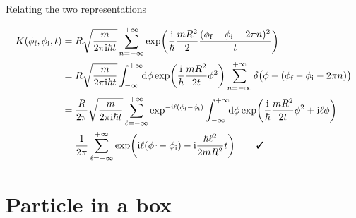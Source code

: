 \documentclass[t,dvipsnames]{beamer}
\begin{document}
\begin{frame}[c]{Relating the two representations}
 \begin{footnotesize}
  \begin{displaymath}
   \begin{aligned}
    K(\phi_\text{f}, \phi_\text{i}, t)
    &= R\sqrt{\frac{m}{2\pi\text{i}\hbar t}}
        \sum_{n=-\infty}^{+\infty}\exp\!\left(\frac{\text{i}}{\hbar}\frac{mR^2}{2}
        \frac{(\phi_\text{f}-\phi_\text{i}-2\pi n)^2}{t}\right)\\
    &= R\sqrt{\frac{m}{2\pi\text{i}\hbar t}}\int_{-\infty}^{+\infty}\!\!\text{d}\phi
       \exp\!\left(\frac{\text{i}}{\hbar}\frac{mR^2}{2t}\phi^2\right)
       \sum_{n=-\infty}^{+\infty}\delta\big(\phi-(\phi_\text{f}-\phi_\text{i}-2\pi n)\big)\\
    &= \frac{R}{2\pi}\sqrt{\frac{m}{2\pi\text{i}\hbar t}}\sum_{\ell=-\infty}^{+\infty}
 	  \exp^{-\text{i}\ell(\phi_\text{f}-\phi_\text{i})}\int_{-\infty}^{+\infty}\!\!\text{d}\phi
       \exp\!\left(\frac{\text{i}}{\hbar}\frac{mR^2}{2t}\phi^2+\text{i}\ell\phi\right)\\
    &= \frac{1}{2\pi}\sum_{\ell=-\infty}^{+\infty}\exp\!\left(\text{i}\ell(\phi_\text{f}-\phi_\text{i})
	   -\text{i}\frac{\hbar\ell^2}{2mR^2}t\right)\qquad\text{\normalsize\ding{51}}
   \end{aligned}
  \end{displaymath}
 \end{footnotesize}

 \vspace{0.4truecm}
 \begin{center}
 \end{center}
\end{frame}

\section{Particle in a box}

\begin{frame}[c]{}
 \begin{center}
  \begin{minipage}{0.8\textwidth}
   \tableofcontents[currentsection]
  \end{minipage}
 \end{center}
\end{frame}
\end{document}
